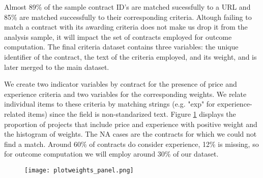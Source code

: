 Almost 89\% of the sample contract ID's are matched sucessfully to a URL and 85\% are matched successfully to their corresponding criteria. Altough failing to match a contract with its awarding criteria does not make us drop it from the analysis sample, it will impact the set of contracts employed for outcome computation. The final criteria dataset contains three variables: the unique identifier of the contract, the text of the criteria employed, and its weight, and is later merged to the main dataset.

We create two indicator variables by contract for the presence of price and experience criteria and two variables for the corresponding weights. We relate individual items to these criteria by matching strings (e.g. "exp" for experience-related items) since the field is non-standarized text. Figure \ref{fig:plotweights_panel} displays the proportion of projects that include price and experience with positive weight and the histogram of weights. The NA cases are the contracts for which we could not find a match. Around 60\% of contracts do consider experience, 12\% is missing, so for outcome computation we will employ around 30\% of our dataset.

\begin{figure}
  \texttt{[image: plotweights\_panel.png]}
  \caption{}
  \label{fig:plotweights_panel}
\end{figure}
